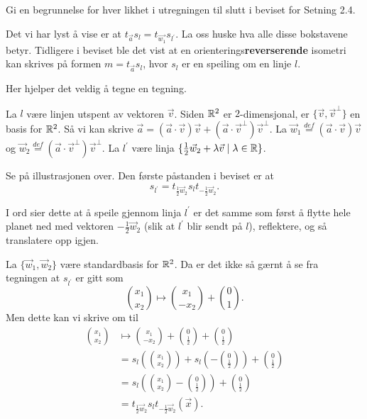 \documentclass[11pt, norsk]{article}
\begin{document}
\begin{oppg}
Gi en begrunnelse for hver likhet i utregningen til slutt i beviset for Setning 2.4.
\end{oppg}
\begin{losn}
Det vi har lyst å vise er at $t_{\vec a} s_l = t_{\vec{w_1}} s_{l^\prime}$. La oss huske hva alle disse bokstavene betyr. Tidligere i beviset ble det vist at en orienterings\textbf{reverserende} isometri kan skrives på formen $m=t_{\vec a} s_l$, hvor $s_l$ er en speiling om en linje $l$.

Her hjelper det veldig å tegne en tegning.

La $l$ være linjen utspent av vektoren $\vec v$. Siden $\mathbb{R}^2$ er $2$-dimensjonal, er $\{ \vec v, \vec v^\perp \}$ en basis for $\mathbb{R}^2$. Så vi kan skrive $\vec a = (\vec a \cdot \vec v) \vec v + (\vec a \cdot \vec v^\perp) \vec v^\perp$. La $\vec w_1 \stackrel{def}{=} (\vec a \cdot \vec v) \vec v$ og $\vec w_2 \stackrel{def}{=} (\vec a \cdot \vec v^\perp) \vec v^\perp$. La $l^\prime$ være linja $\{ \frac 12 \vec w_2 + \lambda \vec v \mid \lambda \in \mathbb{R}\}$. 


\begin{figure}[h]
\begin{center}
\end{center}
\end{figure}
Se på illustrasjonen over. Den første påstanden i beviset er at
$$s_{l^\prime} =  t_{\frac 12 \vec w_2} s_l t_{-\frac 12 \vec w_2}.$$

I ord sier dette at å speile gjennom linja $l^\prime$ er det samme som først å flytte hele planet ned med vektoren $-\frac 12 \vec w_2$ (slik at $l^\prime$ blir sendt på $l$), reflektere, og så translatere opp igjen. 

La $\{\vec w_1, \vec w_2\}$ være standardbasis for $\mathbb{R}^2$. Da er det ikke så gærnt å se fra tegningen at $s_{l^\prime}$ er gitt som
$$
\binom{x_1}{x_2} \mapsto \binom{x_1}{-x_2} + \binom{0}{1}.
$$
Men dette kan vi skrive om til
\begin{align*}
\binom{x_1}{x_2} &\mapsto \binom{x_1}{-x_2} + \binom{0}{\frac 12} + \binom{0}{\frac 12} \\
&= s_l(\binom{x_1}{x_2}) + s_l(-\binom{0}{\frac 12}) + \binom{0}{\frac 12} \\
&= s_l( \binom{x_1}{x_2} - \binom{0}{\frac 12}) + \binom{0}{\frac 12} \\
&= t_{\frac 12 \vec w_2}s_lt_{-\frac 12 \vec w_2}(\vec x).
\end{align*}


\end{losn}
\end{document}
